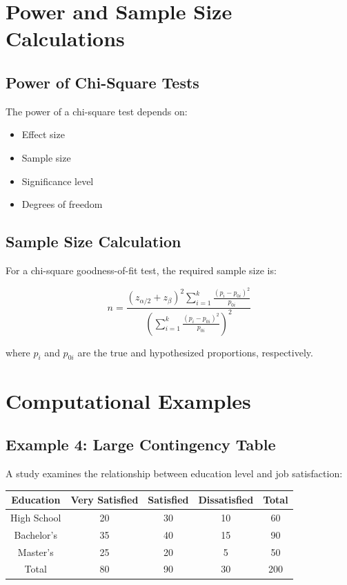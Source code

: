 \documentclass[twoside]{book}
\begin{document}
\section{Power and Sample Size Calculations}

\subsection{Power of Chi-Square Tests}

The power of a chi-square test depends on:
\begin{itemize}
    \item Effect size
    \item Sample size
    \item Significance level
    \item Degrees of freedom
\end{itemize}

\subsection{Sample Size Calculation}

For a chi-square goodness-of-fit test, the required sample size is:

\begin{equation}
n = \frac{(z_{\alpha/2} + z_{\beta})^2 \sum_{i=1}^{k} \frac{(p_i - p_{0i})^2}{p_{0i}}}{\left(\sum_{i=1}^{k} \frac{(p_i - p_{0i})^2}{p_{0i}}\right)^2}
\end{equation}

where $p_i$ and $p_{0i}$ are the true and hypothesized proportions, respectively.

\section{Computational Examples}

\subsection{Example 4: Large Contingency Table}

A study examines the relationship between education level and job satisfaction:

\begin{center}
\begin{tabular}{|c|c|c|c|c|}
\hline
Education & Very Satisfied & Satisfied & Dissatisfied & Total \\
\hline
High School & 20 & 30 & 10 & 60 \\
Bachelor's & 35 & 40 & 15 & 90 \\
Master's & 25 & 20 & 5 & 50 \\
\hline
Total & 80 & 90 & 30 & 200 \\
\hline
\end{tabular}
\end{center}
\end{document}
